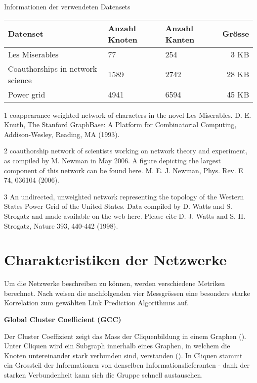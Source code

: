 \begin{threeparttable}
    \centering
    \label{dataset_info}
    \caption{Informationen der verwendeten Datensets}
    \begin{tabular}{@{}lllr@{}}
        \toprule
        Datenset                        & Anzahl Knoten & Anzahl Kanten & Grösse \\ \midrule
        Les Miserables\tnote{1}                 & 77     & 254 & 3 KB   \\
        Coauthorships in network science\tnote{2} & 1589    & 2742 & 28 KB     \\
        Power grid\tnote{3}                       & 4941   & 6594 & 45 KB   \\ \bottomrule
    \end{tabular}
    \begin{tablenotes}[\flushleft]
        \footnotesize
        \item[1] coappearance weighted network of characters in the novel Les Miserables. D. E. Knuth, The Stanford GraphBase: A Platform for Combinatorial Computing, Addison-Wesley, Reading, MA (1993).
        \item[2] coauthorship network of scientists working on network theory and experiment, as compiled by M. Newman in May 2006. A figure depicting the largest component of this network can be found here. M. E. J. Newman, Phys. Rev. E 74, 036104 (2006).
        \item[3] An undirected, unweighted network representing the topology of the Western States Power Grid of the United States. Data compiled by D. Watts and S. Strogatz and made available on the web here. Please cite D. J. Watts and S. H. Strogatz, Nature 393, 440-442 (1998).
    \end{tablenotes}
\end{threeparttable}

\section{Charakteristiken der Netzwerke}
Um die Netzwerke beschreiben zu können, werden verschiedene Metriken berechnet.
Nach \citeauthor{gao_link_2015} weisen die nachfolgenden vier Messgrössen eine besonders starke Korrelation zum gewählten Link Prediction Algorithmus auf.

\textbf{Global Cluster Coefficient (GCC)}

Der Cluster Coeffizient zeigt das Mass der Cliquenbildung in einem Graphen (\cite{michael_henninger_soziale_2018}).
Unter Cliquen wird ein Subgraph innerhalb eines Graphen, in welchem die Knoten untereinander stark verbunden sind, verstanden (\cite{michael_henninger_soziale_2018}).
In Cliquen stammt ein Grossteil der Informationen von denselben Informationslieferanten - dank der starken Verbundenheit kann sich die Gruppe schnell austauschen.

